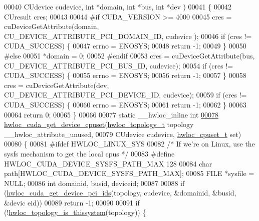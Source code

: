 \begin{DoxyCode}
00040                                CUdevice cudevice, \textcolor{keywordtype}{int} *domain, \textcolor{keywordtype}{int} *bus, \textcolor{keywordtype}{int} *dev
      )
00041 \{
00042   CUresult cres;
00043 
00044 \textcolor{preprocessor}{#if CUDA\_VERSION >= 4000}
00045 \textcolor{preprocessor}{}  cres = cuDeviceGetAttribute(domain, CU\_DEVICE\_ATTRIBUTE\_PCI\_DOMAIN\_ID, cudevice
      );
00046   \textcolor{keywordflow}{if} (cres != CUDA\_SUCCESS) \{
00047     errno = ENOSYS;
00048     \textcolor{keywordflow}{return} -1;
00049   \}
00050 \textcolor{preprocessor}{#else}
00051 \textcolor{preprocessor}{}  *domain = 0;
00052 \textcolor{preprocessor}{#endif}
00053 \textcolor{preprocessor}{}  cres = cuDeviceGetAttribute(bus, CU\_DEVICE\_ATTRIBUTE\_PCI\_BUS\_ID, cudevice);
00054   \textcolor{keywordflow}{if} (cres != CUDA\_SUCCESS) \{
00055     errno = ENOSYS;
00056     \textcolor{keywordflow}{return} -1;
00057   \}
00058   cres = cuDeviceGetAttribute(dev, CU\_DEVICE\_ATTRIBUTE\_PCI\_DEVICE\_ID, cudevice);
00059   \textcolor{keywordflow}{if} (cres != CUDA\_SUCCESS) \{
00060     errno = ENOSYS;
00061     \textcolor{keywordflow}{return} -1;
00062   \}
00063 
00064   \textcolor{keywordflow}{return} 0;
00065 \}
00066 
00077 \textcolor{keyword}{static} \_\_hwloc\_inline \textcolor{keywordtype}{int}
\hypertarget{a00028_source_l00078}{}\hyperlink{a00070_gae06cf330d2f0d9949feb52b146b7d136}{00078} \hyperlink{a00070_gae06cf330d2f0d9949feb52b146b7d136}{hwloc_cuda_get_device_cpuset}(\hyperlink{a00039_ga9d1e76ee15a7dee158b786c30b6a6e38}{hwloc_topology_t} topology \_\_hwloc\_attribute\_unused,
00079                              CUdevice cudevice, \hyperlink{a00040_ga4bbf39b68b6f568fb92739e7c0ea7801}{hwloc_cpuset_t} \textcolor{keyword}{set})
00080 \{
00081 \textcolor{preprocessor}{#ifdef HWLOC\_LINUX\_SYS}
00082 \textcolor{preprocessor}{}  \textcolor{comment}{/* If we're on Linux, use the sysfs mechanism to get the local cpus */}
00083 \textcolor{preprocessor}{#define HWLOC\_CUDA\_DEVICE\_SYSFS\_PATH\_MAX 128}
00084 \textcolor{preprocessor}{}  \textcolor{keywordtype}{char} path[HWLOC\_CUDA\_DEVICE\_SYSFS\_PATH\_MAX];
00085   FILE *sysfile = NULL;
00086   \textcolor{keywordtype}{int} domainid, busid, deviceid;
00087 
00088   \textcolor{keywordflow}{if} (\hyperlink{a00070_gae45c92fbc7ac538cf69fdfcc73994ed9}{hwloc_cuda_get_device_pci_ids}(topology, cudevice, &domainid, &busid, &devic
      eid))
00089     \textcolor{keywordflow}{return} -1;
00090 
00091   \textcolor{keywordflow}{if} (!\hyperlink{a00046_ga0d109e33fc7990f62f665d336e5e5111}{hwloc_topology_is_thissystem}(topology)) \{

\end{DoxyCode}
